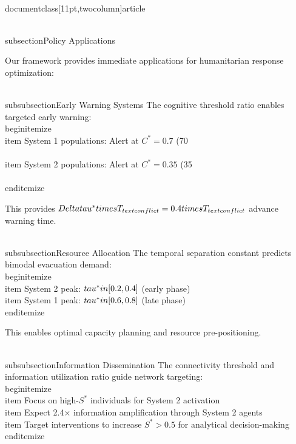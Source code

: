 \\documentclass[11pt,twocolumn]{article}
\begin{document}
{{\\subsection{Policy Applications}

Our framework provides immediate applications for humanitarian response optimization:

\\subsubsection{Early Warning Systems}
The cognitive threshold ratio enables targeted early warning:
\\begin{itemize}
    \\item System 1 populations: Alert at $C^* = 0.7$ (70\\%
    \\item System 2 populations: Alert at $C^* = 0.35$ (35\\%
\\end{itemize}

This provides $\\Delta\\tau^* \\times T_{\\text{conflict}} = 0.4 \\times T_{\\text{conflict}}$ advance warning time.

\\subsubsection{Resource Allocation}
The temporal separation constant predicts bimodal evacuation demand:
\\begin{itemize}
    \\item System 2 peak: $\\tau^* \\in [0.2, 0.4]$ (early phase)
    \\item System 1 peak: $\\tau^* \\in [0.6, 0.8]$ (late phase)
\\end{itemize}

This enables optimal capacity planning and resource pre-positioning.

\\subsubsection{Information Dissemination}
The connectivity threshold and information utilization ratio guide network targeting:
\\begin{itemize}
    \\item Focus on high-$S^*$ individuals for System 2 activation
    \\item Expect 2.4× information amplification through System 2 agents
    \\item Target interventions to increase $S^* > 0.5$ for analytical decision-making
\\end{itemize}

}}
\end{document}
